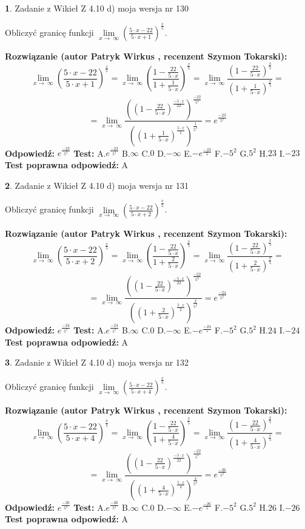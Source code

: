 \documentclass[12pt, a4paper]{article}
\theoremstyle{definition} %
\newtheorem{zad}{}
\newcommand{\zadStart}[1]{\begin{zad}#1\newline}
\newcommand{\zadStop}{\end{zad}}
\newcommand{\rozwStart}[2]{\noindent \textbf{Rozwiązanie (autor #1 , recenzent #2): }\newline}
\newcommand{\rozwStop}{\newline}
\newcommand{\odpStart}{\noindent \textbf{Odpowiedź:}\newline}
\newcommand{\odpStop}{\newline}
\newcommand{\testStart}{\noindent \textbf{Test:}\newline}
\newcommand{\testStop}{\newline}
\newcommand{\kluczStart}{\noindent \textbf{Test poprawna odpowiedź:}\newline}
\newcommand{\kluczStop}{\newline}
\begin{document}
\zadStart{Zadanie z Wikieł Z 4.10 d) moja wersja nr 130}


Obliczyć granicę funkcji  $\lim\limits_{x\to\ \infty}(\frac{5\cdot x-22}{5\cdot x+1})^{\frac{x}{5}}$.
\zadStop
\rozwStart{Patryk Wirkus}{Szymon Tokarski}
$$\lim\limits_{x\to\ \infty}(\frac{5\cdot x-22}{5\cdot x+1})^{\frac{x}{5}} = \lim\limits_{x\to\ \infty}(\frac{1-\frac{22}{5\cdot x}}{1+\frac{1}{5\cdot x}})^{\frac{x}{5}}=\lim\limits_{x\to\ \infty}\frac{(1-\frac{22}{5\cdot x})^{\frac{x}{5}}}{(1+\frac{1}{5\cdot x})^{\frac{x}{5}}}=$$
$$=\lim\limits_{x\to\ \infty}\frac{((1-\frac{22}{5\cdot x})^{\frac{-5\cdot x}{22}})^{\frac{-22}{5^{2}}}}{((1+\frac{1}{5\cdot x})^{\frac{5\cdot x}{1}})^{\frac{1}{5^{2}}}}=e^{\frac{-23}{5^{2}}}$$
\rozwStop
\odpStart
$e^{\frac{-23}{5^{2}}}$
\odpStop
\testStart
A.$e^{\frac{-23}{5^{2}}}$ B.$\infty$ C.$0$ D.$-\infty$ E.$-e^{\frac{-23}{5}}$
F.$-5^{2}$ G.$5^{2}$
H.$23$
I.$-23$
\testStop
\kluczStart
A
\kluczStop



\zadStart{Zadanie z Wikieł Z 4.10 d) moja wersja nr 131}


Obliczyć granicę funkcji  $\lim\limits_{x\to\ \infty}(\frac{5\cdot x-22}{5\cdot x+2})^{\frac{x}{5}}$.
\zadStop
\rozwStart{Patryk Wirkus}{Szymon Tokarski}
$$\lim\limits_{x\to\ \infty}(\frac{5\cdot x-22}{5\cdot x+2})^{\frac{x}{5}} = \lim\limits_{x\to\ \infty}(\frac{1-\frac{22}{5\cdot x}}{1+\frac{2}{5\cdot x}})^{\frac{x}{5}}=\lim\limits_{x\to\ \infty}\frac{(1-\frac{22}{5\cdot x})^{\frac{x}{5}}}{(1+\frac{2}{5\cdot x})^{\frac{x}{5}}}=$$
$$=\lim\limits_{x\to\ \infty}\frac{((1-\frac{22}{5\cdot x})^{\frac{-5\cdot x}{22}})^{\frac{-22}{5^{2}}}}{((1+\frac{2}{5\cdot x})^{\frac{5\cdot x}{2}})^{\frac{2}{5^{2}}}}=e^{\frac{-24}{5^{2}}}$$
\rozwStop
\odpStart
$e^{\frac{-24}{5^{2}}}$
\odpStop
\testStart
A.$e^{\frac{-24}{5^{2}}}$ B.$\infty$ C.$0$ D.$-\infty$ E.$-e^{\frac{-24}{5}}$
F.$-5^{2}$ G.$5^{2}$
H.$24$
I.$-24$
\testStop
\kluczStart
A
\kluczStop



\zadStart{Zadanie z Wikieł Z 4.10 d) moja wersja nr 132}


Obliczyć granicę funkcji  $\lim\limits_{x\to\ \infty}(\frac{5\cdot x-22}{5\cdot x+4})^{\frac{x}{5}}$.
\zadStop
\rozwStart{Patryk Wirkus}{Szymon Tokarski}
$$\lim\limits_{x\to\ \infty}(\frac{5\cdot x-22}{5\cdot x+4})^{\frac{x}{5}} = \lim\limits_{x\to\ \infty}(\frac{1-\frac{22}{5\cdot x}}{1+\frac{4}{5\cdot x}})^{\frac{x}{5}}=\lim\limits_{x\to\ \infty}\frac{(1-\frac{22}{5\cdot x})^{\frac{x}{5}}}{(1+\frac{4}{5\cdot x})^{\frac{x}{5}}}=$$
$$=\lim\limits_{x\to\ \infty}\frac{((1-\frac{22}{5\cdot x})^{\frac{-5\cdot x}{22}})^{\frac{-22}{5^{2}}}}{((1+\frac{4}{5\cdot x})^{\frac{5\cdot x}{4}})^{\frac{4}{5^{2}}}}=e^{\frac{-26}{5^{2}}}$$
\rozwStop
\odpStart
$e^{\frac{-26}{5^{2}}}$
\odpStop
\testStart
A.$e^{\frac{-26}{5^{2}}}$ B.$\infty$ C.$0$ D.$-\infty$ E.$-e^{\frac{-26}{5}}$
F.$-5^{2}$ G.$5^{2}$
H.$26$
I.$-26$
\testStop
\kluczStart
A
\kluczStop
\end{document}
